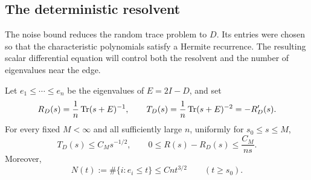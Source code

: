 \subsection{The deterministic resolvent}
The noise bound reduces the random trace problem to $D$. Its entries
were chosen so that the characteristic polynomials satisfy a Hermite
recurrence. The resulting scalar differential equation will control both
the resolvent and the number of eigenvalues near the edge.

\begin{lemma}
\label{lem:deterministic-resolvent}
Let $e_1\le\cdots\le e_n$ be the eigenvalues of $E=2I-D$, and set
\[
 R_D(s)=\frac1n\operatorname{Tr}(s+E)^{-1},\qquad
 T_D(s)=\frac1n\operatorname{Tr}(s+E)^{-2}=-R_D'(s).
\]
For every fixed $M<\infty$ and all sufficiently large $n$, uniformly for
$s_0\le s\le M$,
\begin{equation}
 T_D(s)\le C_Ms^{-1/2},\qquad
 0\le R(s)-R_D(s)\le\frac{C_M}{ns}.
 \label{eq:deterministic-traces}
\end{equation}
Moreover,
\begin{equation}
 N(t):=\#\{i:e_i\le t\}\le Cnt^{3/2}
 \qquad(t\ge s_0).
 \label{eq:deterministic-counting}
\end{equation}
\end{lemma}

